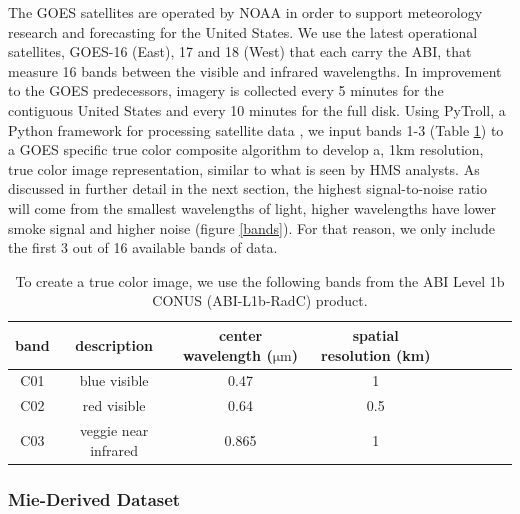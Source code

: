 \documentclass{article}
\begin{document}
The GOES satellites are operated by NOAA in order to support meteorology research and forecasting for the United States. We use the latest operational satellites, GOES-16 (East), 17 and 18 (West) that each carry the ABI, that measure 16 bands between the visible and infrared wavelengths. In improvement to the GOES predecessors, imagery is collected every 5 minutes for the contiguous United States and every 10 minutes for the full disk. Using PyTroll, a Python framework for processing satellite data \cite{satpy}, we input bands 1-3 (Table \ref{rgb_bands}) to a GOES specific true color composite algorithm \cite{true_color} to develop a, 1km resolution, true color image representation, similar to what is seen by HMS analysts. As discussed in further detail in the next section, the highest signal-to-noise ratio will come from the smallest wavelengths of light, higher wavelengths have lower smoke signal and higher noise (figure \ref{bands}). For that reason, we only include the first 3 out of 16 available bands of data.

\begin{table}
    \caption{To create a true color image, we use the following bands from the ABI Level 1b CONUS (ABI-L1b-RadC) product.}\label{rgb_bands}
    \centering
        \begin{tabular}{ccccrrcrc}
            \toprule
            band & description & center wavelength ($\mathrm{\mu m}$) & spatial resolution (km)\\
            \midrule
            C01 &  blue visible & 0.47 & 1 \\
            C02 & red visible & 0.64 & 0.5 \\
            C03 & veggie near infrared & 0.865 & 1 \\
            \bottomrule
        \end{tabular}
\end{table}


\subsubsection*{Mie-Derived Dataset}
\end{document}
